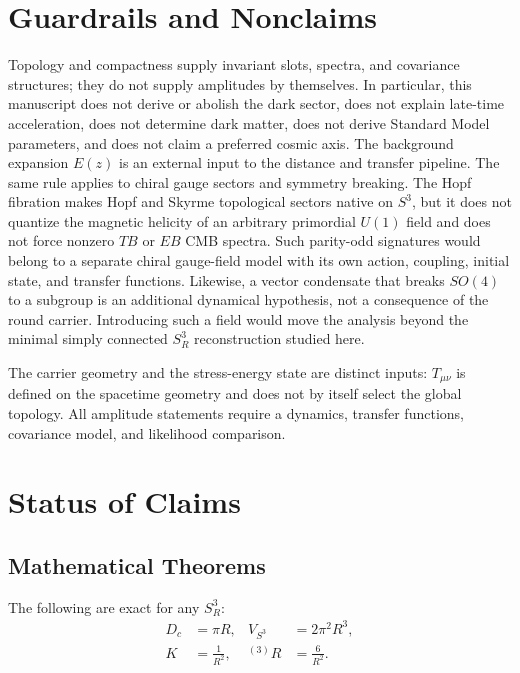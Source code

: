 \documentclass[aps,prd,onecolumn,superscriptaddress,longbibliography,nofootinbib,notitlepage]{revtex4-2}
\begin{document}
\section{Guardrails and Nonclaims}
\label{sec:guardrails-compressed}

Topology and compactness supply invariant slots, spectra, and covariance structures; they
do not supply amplitudes by themselves. In particular, this manuscript does not derive or
abolish the dark sector, does not explain late-time acceleration, does not determine dark
matter, does not derive Standard Model parameters, and does not claim a preferred cosmic
axis. The background expansion $E(z)$ is an external input to the distance and transfer
pipeline.
The same rule applies to chiral gauge sectors and symmetry breaking. The Hopf fibration
makes Hopf and Skyrme topological sectors native on $S^3$, but it does not quantize the
magnetic helicity of an arbitrary primordial $U(1)$ field and does not force nonzero
$TB$ or $EB$ CMB spectra. Such parity-odd signatures would belong to a separate chiral
gauge-field model with its own action, coupling, initial state, and transfer functions.
Likewise, a vector condensate that breaks $SO(4)$ to a subgroup is an additional
dynamical hypothesis, not a consequence of the round carrier. Introducing such a field
would move the analysis beyond the minimal simply connected $S^3_R$ reconstruction
studied here.

The carrier geometry and the stress-energy state are distinct inputs: $T_{\mu\nu}$ is
defined on the spacetime geometry and does not by itself select the global topology. All
amplitude statements require a dynamics, transfer functions, covariance model, and
likelihood comparison.

\section{Status of Claims}
\label{sec:status}

\subsection{Mathematical Theorems}

The following are exact for any $S^3_R$:
\begin{equation}
\begin{aligned}
  D_c &= \pi R, &
  V_{S^3} &= 2\pi^2 R^3, \\
  K &= \frac{1}{R^2}, &
  {}^{(3)}R &= \frac{6}{R^2}.
\end{aligned}
\end{equation}
\end{document}
